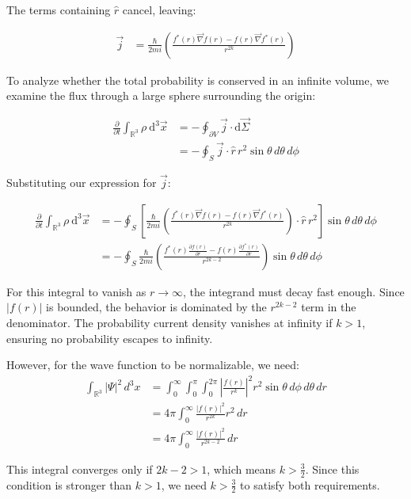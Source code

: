 \documentclass[italian]{HKNdocument}
\begin{document}
The terms containing $\hat{r}$ cancel, leaving:

\begin{align}
\vec{j} &= \frac{\hbar}{2 m i}\left(\frac{f^{*}(r) \vec{\nabla} f(r)-f(r) \vec{\nabla} f^{*}(r)}{r^{2 k}}\right)
\end{align}

To analyze whether the total probability is conserved in an infinite volume, we examine the flux through a large sphere surrounding the origin:

\begin{align}
\frac{\partial}{\partial t} \int_{\mathbb{R}^{3}} \rho \mathrm{~d}^{3} \vec{x} &= -\oint_{\partial V} \vec{j} \cdot \mathrm{d} \vec{\Sigma} \\
&= -\oint_{S} \vec{j} \cdot \hat{r} \, r^{2} \sin\theta \, d\theta \, d\phi
\end{align}

Substituting our expression for $\vec{j}$:

\begin{align}
\frac{\partial}{\partial t} \int_{\mathbb{R}^{3}} \rho \mathrm{~d}^{3} \vec{x} &= -\oint_{S}\left[\frac{\hbar}{2 m i}\left(\frac{f^{*}(r) \vec{\nabla} f(r)-f(r) \vec{\nabla} f^{*}(r)}{r^{2 k}}\right) \cdot \hat{r} \, r^{2}\right] \sin\theta \, d\theta \, d\phi \label{eq:1.42} \\
&= -\oint_{S} \frac{\hbar}{2 m i}\left(\frac{f^{*}(r) \frac{\partial f(r)}{\partial r}-f(r) \frac{\partial f^{*}(r)}{\partial r}}{r^{2 k-2}}\right) \sin\theta \, d\theta \, d\phi
\end{align}

For this integral to vanish as $r \to \infty$, the integrand must decay fast enough. Since $|f(r)|$ is bounded, the behavior is dominated by the $r^{2k-2}$ term in the denominator. The probability current density vanishes at infinity if $k > 1$, ensuring no probability escapes to infinity.

However, for the wave function to be normalizable, we need:
\begin{align}
\int_{\mathbb{R}^{3}} |\Psi|^2 \, d^3x &= \int_0^\infty \int_0^\pi \int_0^{2\pi} \left|\frac{f(r)}{r^k}\right|^2 r^2 \sin\theta \, d\phi \, d\theta \, dr \\
&= 4\pi \int_0^\infty \frac{|f(r)|^2}{r^{2k}} r^2 \, dr \\
&= 4\pi \int_0^\infty \frac{|f(r)|^2}{r^{2k-2}} \, dr
\end{align}

This integral converges only if $2k-2 > 1$, which means $k > \frac{3}{2}$. Since this condition is stronger than $k > 1$, we need $k > \frac{3}{2}$ to satisfy both requirements.
\end{document}
